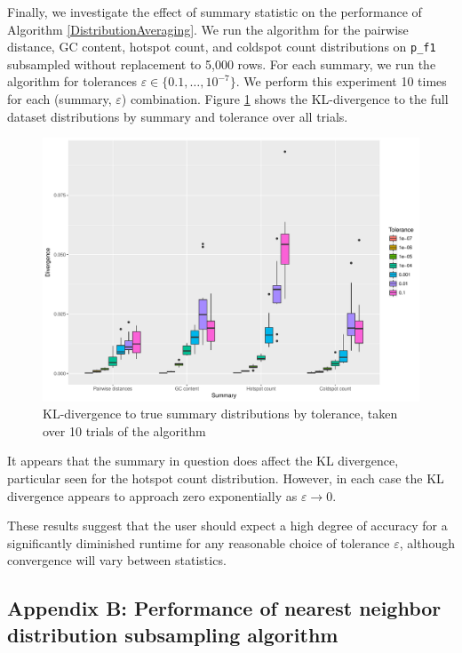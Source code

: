 \documentclass{article}
\begin{document}
Finally, we investigate the effect of summary statistic on the performance of Algorithm \ref{DistributionAveraging}.
We run the algorithm for the pairwise distance, GC content, hotspot count, and coldspot count distributions on \texttt{p\_f1} subsampled without replacement to 5,000 rows.
For each summary, we run the algorithm for tolerances $\varepsilon \in \{0.1, \dotsc, 10^{-7}\}$.
We perform this experiment 10 times for each (summary, $\varepsilon$) combination.
Figure \ref{fig:SummaryPerformance} shows the KL-divergence to the full dataset distributions by summary and tolerance over all trials.
\begin{figure}
    \includegraphics[width=\linewidth]{Figures/Multiple/div_by_summary_and_tol.pdf}
    \caption{KL-divergence to true summary distributions by tolerance, taken over 10 trials of the algorithm}
    \label{fig:SummaryPerformance}
\end{figure}
It appears that the summary in question does affect the KL divergence, particular seen for the hotspot count distribution.
However, in each case the KL divergence appears to approach zero exponentially as $\varepsilon \to 0$. 

These results suggest that the user should expect a high degree of accuracy for a significantly diminished runtime for any reasonable choice of tolerance $\varepsilon$, although convergence will vary between statistics.

\subsection*{Appendix B: Performance of nearest neighbor distribution subsampling algorithm}
\end{document}
